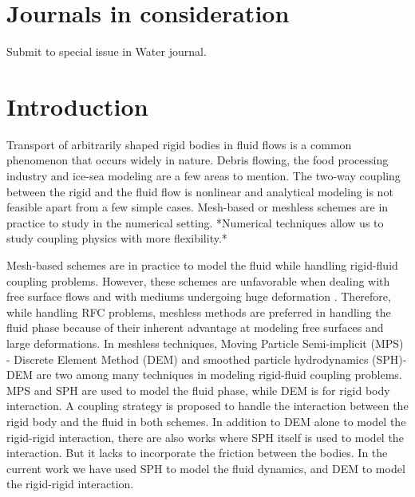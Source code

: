 \documentclass[preprint,12pt]{elsarticle}
\begin{document}

\section{Journals in consideration}

Submit to special issue in Water journal.


\section{Introduction}
\label{sec:intro}
Transport of arbitrarily shaped rigid bodies in fluid flows is a common
phenomenon that occurs widely in nature. Debris flowing, the food processing
industry and ice-sea modeling are a few areas to mention. The two-way coupling
between the rigid and the fluid flow is nonlinear and analytical modeling is
not feasible apart from a few simple cases. Mesh-based or meshless schemes are
in practice to study in the numerical setting. *Numerical techniques allow us
to study coupling physics with more flexibility.*

Mesh-based schemes are in practice \cite{dettmer_computational_2006} to model
the fluid while handling rigid-fluid coupling problems. However, these schemes
are unfavorable when dealing with free surface flows and with mediums
undergoing huge deformation \cite{walkley_finite_2005}. Therefore, while
handling RFC problems, meshless methods are preferred in handling the fluid
phase because of their inherent advantage at modeling free surfaces and large
deformations. In meshless techniques, Moving Particle Semi-implicit (MPS) -
Discrete Element Method (DEM) \cite{guo2017numerical} and smoothed particle
hydrodynamics (SPH)-DEM \cite{canelas2016sph} are two among many techniques in
modeling rigid-fluid coupling problems. MPS and SPH are used to model the
fluid phase, while DEM is for rigid body interaction. A coupling strategy is
proposed to handle the interaction between the rigid body and the fluid in
both schemes. In addition to DEM alone to model the rigid-rigid interaction,
there are also works where SPH \cite{amicarelli2015smoothed} itself is used to
model the interaction. But it lacks to incorporate the friction between the
bodies. In the current work we have used SPH to model the fluid dynamics, and
DEM to model the rigid-rigid interaction.
\end{document}
